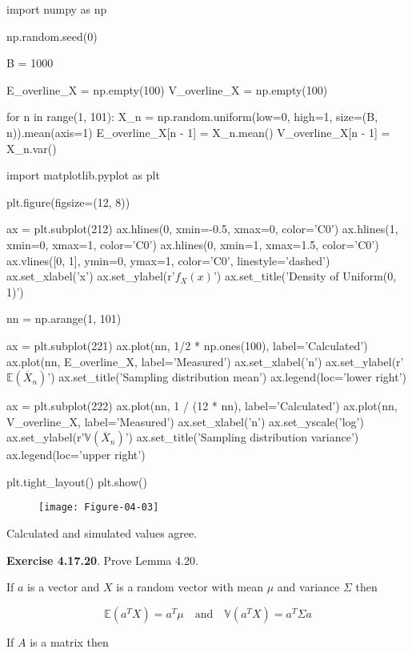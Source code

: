 \begin{python}
import numpy as np

np.random.seed(0)

B = 1000

E_overline_X = np.empty(100)
V_overline_X = np.empty(100)

for n in range(1, 101):
    X_{n} = np.random.uniform(low=0, high=1, size=(B, n)).mean(axis=1)
    E_overline_X[n - 1] = X_{n}.mean()
    V_overline_X[n - 1] = X_{n}.var()
\end{python}

\begin{python}
import matplotlib.pyplot as plt

plt.figure(figsize=(12, 8))

ax = plt.subplot(212)
ax.hlines(0, xmin=-0.5, xmax=0, color='C0')
ax.hlines(1, xmin=0, xmax=1, color='C0')
ax.hlines(0, xmin=1, xmax=1.5, color='C0')
ax.vlines([0, 1], ymin=0, ymax=1, color='C0', linestyle='dashed')
ax.set_xlabel('x')
ax.set_ylabel(r'$f_X(x)$')
ax.set_title('Density of Uniform(0, 1)')

nn = np.arange(1, 101)

ax = plt.subplot(221)
ax.plot(nn, 1/2 * np.ones(100), label='Calculated')
ax.plot(nn, E_overline_X, label='Measured')
ax.set_xlabel('n')
ax.set_ylabel(r'$\mathbb{E}(\overline{X}_{n})$')
ax.set_title('Sampling distribution mean')
ax.legend(loc='lower right')

ax = plt.subplot(222)
ax.plot(nn, 1 / (12 * nn), label='Calculated')
ax.plot(nn, V_overline_X, label='Measured')
ax.set_xlabel('n')
ax.set_yscale('log')
ax.set_ylabel(r'$\mathbb{V}(\overline{X}_{n})$')
ax.set_title('Sampling distribution variance')
ax.legend(loc='upper right')

plt.tight_layout()
plt.show()
\end{python}

\begin{figure}[H]
\centering
\texttt{[image: Figure-04-03]}
\end{figure}

Calculated and simulated values agree.

\textbf{Exercise 4.17.20}. Prove Lemma 4.20.

If \(a\) is a vector and \(X\) is a random vector with mean \(\mu\) and
variance \(\Sigma\) then

\[ \mathbb{E}(a^T X) = a^T \mu
\quad \text{and} \quad
\mathbb{V}(a^T X) = a^T \Sigma a \]

If \(A\) is a matrix then

